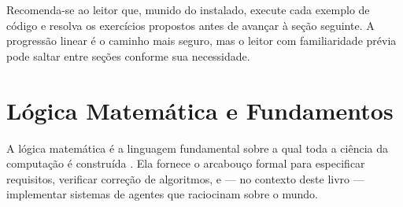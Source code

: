 \begin{table}[htb]
    \centering
    \small
    \caption{Conteúdo do Capítulo 1}
\end{table}

Recomenda-se ao leitor que, munido do \opencodeeco{} instalado, execute cada
exemplo de código e resolva os exercícios propostos antes de avançar à seção
seguinte. A progressão linear é o caminho mais seguro, mas o leitor com
familiaridade prévia pode saltar entre seções conforme sua necessidade.

\section{Lógica Matemática e Fundamentos}
\label{sec:logica-matematica}
\nivelzero

A lógica matemática é a linguagem fundamental sobre a qual toda a ciência da
computação é construída \cite{russell2020inteligencia}. Ela fornece o
arcabouço formal para especificar requisitos, verificar correção de
algoritmos, e --- no contexto deste livro --- implementar sistemas de agentes
que raciocinam sobre o mundo.

